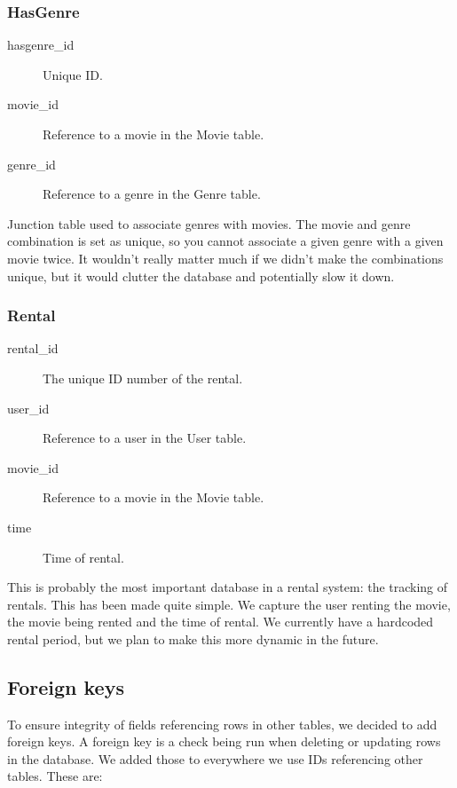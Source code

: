 \subsubsection{HasGenre}
\label{database_design_tables_hasgenre}

\begin{description}
\item[hasgenre_id] Unique ID.
\item[movie_id] Reference to a movie in the Movie table.
\item[genre_id] Reference to a genre in the Genre table.
\end{description}

Junction table used to associate genres with movies. The movie and genre combination is set as unique, so you cannot associate a given genre with a given movie twice. It wouldn't really matter much if we didn't make the combinations unique, but it would clutter the database and potentially slow it down.

\subsubsection{Rental}
\label{database_design_tables_rental}

\begin{description}
\item[rental_id] The unique ID number of the rental.
\item[user_id] Reference to a user in the User table.
\item[movie_id] Reference to a movie in the Movie table.
\item[time] Time of rental.
\end{description}

This is probably the most important database in a rental system: the tracking of rentals. This has been made quite simple. We capture the user renting the movie, the movie being rented and the time of rental. We currently have a hardcoded rental period, but we plan to make this more dynamic in the future.

\subsection{Foreign keys}
\label{database_design_foreignkeys}
To ensure integrity of fields referencing rows in other tables, we decided to add foreign keys. A foreign key is a check being run when deleting or updating rows in the database. We added those to everywhere we use IDs referencing other tables. These are:

